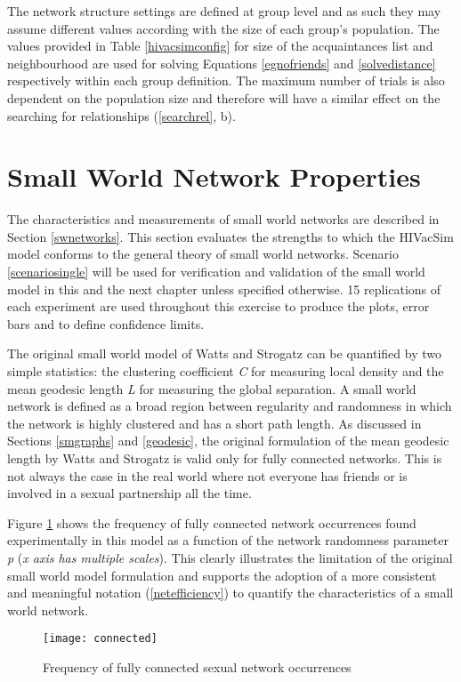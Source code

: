 The network structure settings are defined at group level and as such they may assume
different values according with the size of each group's population. The values provided
in Table \ref{hivacsimconfig} for size of the acquaintances list and neighbourhood are
used for solving Equations \ref{egnofriends} and \ref{solvedistance} respectively within
each group definition. The maximum number of trials is also dependent on the population
size and therefore will have a similar effect on the searching for relationships
(\ref{searchrel}, b).

\section{Small World Network Properties}\label{swnproperties}

The characteristics and measurements of small world networks are described in Section
\ref{swnetworks}. This section evaluates the strengths to which the HIVacSim model
conforms to the general theory of small world networks. Scenario \ref{scenariosingle}
will be used for verification and validation of the small world model in this and the
next chapter unless specified otherwise. 15 replications of each experiment are used
throughout this exercise to produce the plots, error bars and to define confidence
limits.

The original small world model of Watts and Strogatz \cite{Watts1998} can be quantified
by two simple statistics: the clustering coefficient \emph{C} for measuring local density
and the mean geodesic length \emph{L} for measuring the global separation. A small world
network is defined as a broad region between regularity and randomness in which the
network is highly clustered and has a short path length. As discussed in Sections
\ref{smgraphs} and \ref{geodesic}, the original formulation of the mean geodesic length
by Watts and Strogatz \cite{Watts1998} is valid only for fully connected networks. This
is not always the case in the real world where not everyone has friends or is involved in
a sexual partnership all the time.

Figure \ref{connected} shows the frequency of fully connected network occurrences found
experimentally in this model as a function of the network randomness parameter \emph{p}
(\emph{x axis has multiple scales}). This clearly illustrates the limitation of the
original small world model formulation and supports the adoption of a more consistent and
meaningful notation (\ref{netefficiency}) to quantify the characteristics of a small
world network.
\begin{figure}[h]
\texttt{[image: connected]}
\caption{Frequency of fully connected sexual network occurrences} \label{connected}
\end{figure}

